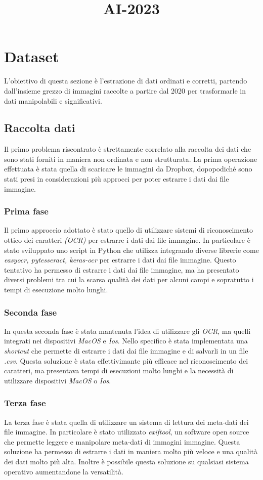 \title{AI-2023}\documentclass[12pt,a4paper,twoside]{article}
\begin{document}
\section{Dataset}
L'obiettivo di questa sezione è l'estrazione di dati ordinati e corretti, partendo dall'insieme grezzo di immagini 
raccolte a partire dal 2020 per trasformarle in dati manipolabili e significativi.

\subsection{Raccolta dati}
Il primo problema riscontrato è strettamente correlato alla raccolta dei dati
che sono stati forniti in maniera non ordinata e non strutturata. La prima operazione effettuata è stata quella di scaricare le immagini da Dropbox, dopopodiché sono stati presi in considerazioni più approcci per poter estrarre i dati dai file immagine.
\subsubsection{Prima fase}
Il primo approccio adottato è stato quello di utilizzare sistemi di riconoscimento ottico dei caratteri \textit{(OCR)} per estrarre i dati dai file immagine. In particolare è stato sviluppato uno script in Python che utilizza integrando diverse librerie come \textit{easyocr, pytesseract, keras-ocr} per estrarre i dati dai file immagine. Questo tentativo ha permesso di estrarre i dati dai file immagine, ma ha presentato diversi problemi tra cui la scarsa qualità dei dati per alcuni campi e sopratutto i tempi di esecuzione molto lunghi. 
\subsubsection{Seconda fase}
In questa seconda fase è stata mantenuta l'idea di utilizzare gli \textit{OCR}, ma quelli integrati nei dispositivi \textit{MacOS} e \textit{Ios}. Nello specifico è stata implementata una \textit{shortcut} che permette di estrarre i dati dai file immagine e di salvarli in un file \textit{.csv}. Questa soluzione è stata effettivimante più efficace nel riconoscimento dei caratteri, ma presentava tempi di esecuzioni molto lunghi e la necessità di utilizzare dispositivi \textit{MacOS} o \textit{Ios}.

\subsubsection{Terza fase}
La terza fase è stata quella di utilizzare un sistema di lettura dei meta-dati dei file immagine. In particolare è stato utilizzato \textit{exiftool}, un software open source che permette leggere e manipolare meta-dati di immagini immagine. Questa soluzione ha permesso di estrarre i dati in maniera molto più veloce e una qualità dei dati molto più alta. Inoltre è possibile questa soluzione su qualsiasi sistema operativo aumentandone la versatilità.
\end{document}
